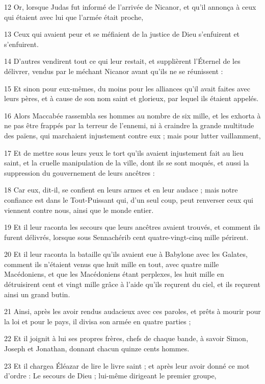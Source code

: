 \par 12 Or, lorsque Judas fut informé de l'arrivée de Nicanor, et qu'il annonça à ceux qui étaient avec lui que l'armée était proche,
\par 13 Ceux qui avaient peur et se méfiaient de la justice de Dieu s'enfuirent et s'enfuirent.
\par 14 D'autres vendirent tout ce qui leur restait, et supplièrent l'Éternel de les délivrer, vendus par le méchant Nicanor avant qu'ils ne se réunissent :
\par 15 Et sinon pour eux-mêmes, du moins pour les alliances qu'il avait faites avec leurs pères, et à cause de son nom saint et glorieux, par lequel ils étaient appelés.
\par 16 Alors Maccabée rassembla ses hommes au nombre de six mille, et les exhorta à ne pas être frappés par la terreur de l'ennemi, ni à craindre la grande multitude des païens, qui marchaient injustement contre eux ; mais pour lutter vaillamment,
\par 17 Et de mettre sous leurs yeux le tort qu'ils avaient injustement fait au lieu saint, et la cruelle manipulation de la ville, dont ils se sont moqués, et aussi la suppression du gouvernement de leurs ancêtres :
\par 18 Car eux, dit-il, se confient en leurs armes et en leur audace ; mais notre confiance est dans le Tout-Puissant qui, d’un seul coup, peut renverser ceux qui viennent contre nous, ainsi que le monde entier.
\par 19 Et il leur raconta les secours que leurs ancêtres avaient trouvés, et comment ils furent délivrés, lorsque sous Sennachérib cent quatre-vingt-cinq mille périrent.
\par 20 Et il leur raconta la bataille qu'ils avaient eue à Babylone avec les Galates, comment ils n'étaient venus que huit mille en tout, avec quatre mille Macédoniens, et que les Macédoniens étant perplexes, les huit mille en détruisirent cent et vingt mille grâce à l'aide qu'ils reçurent du ciel, et ils reçurent ainsi un grand butin.
\par 21 Ainsi, après les avoir rendus audacieux avec ces paroles, et prêts à mourir pour la loi et pour le pays, il divisa son armée en quatre parties ;
\par 22 Et il joignit à lui ses propres frères, chefs de chaque bande, à savoir Simon, Joseph et Jonathan, donnant chacun quinze cents hommes.
\par 23 Et il chargea Éléazar de lire le livre saint ; et après leur avoir donné ce mot d'ordre : Le secours de Dieu ; lui-même dirigeant le premier groupe,
